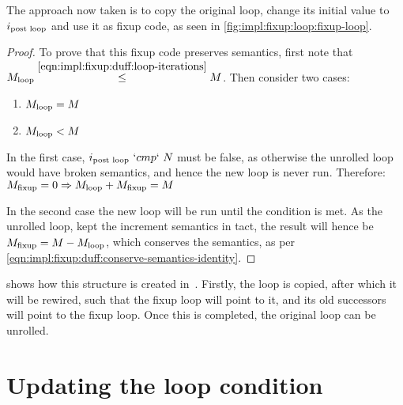 The approach now taken is to copy the original loop, change its initial value to $i_\text{post loop}$ and use it as fixup code, as seen in \cref{fig:impl:fixup:loop:fixup-loop}.



\begin{proof}
    To prove that this fixup code preserves semantics, first note that $M_{\text{loop}} \overset{\ref{eqn:impl:fixup:duff:loop-iterations}}{\leq} M$.
    Then consider two cases:
    \begin{enumerate}
        \item $M_{\text{loop}} = M$
        \item $M_{\text{loop}} < M$
    \end{enumerate}
    In the first case, $i_\text{post loop}~`cmp`~N$ must be false, as otherwise the unrolled loop would have broken semantics, and hence the new loop is never run.
    Therefore: $M_{\text{fixup}} = 0 \Rightarrow M_{\text{loop}} + M_{\text{fixup}} = M$

    In the second case the new loop will be run until the condition is met.
    As the unrolled loop, kept the increment semantics in tact, the result will hence be $M_{\text{fixup}} = M - M_{\text{loop}}$, which conserves the semantics, as per \cref{eqn:impl:fixup:duff:conserve-semantics-identity}.
\end{proof}

 shows how this structure is created in~\libFIRM.
Firstly, the loop is copied, after which it will be rewired, such that the fixup loop will point to it, and its old successors will point to the fixup loop.
Once this is completed, the original loop can be unrolled.



\section{Updating the loop condition}\label{sec:impl:fixup:header-cond}

